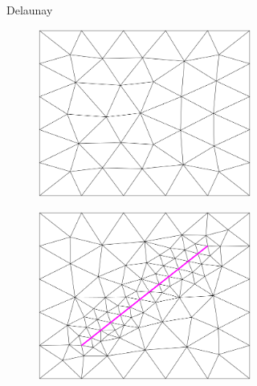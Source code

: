 \begin{figure}[p]
\begin{subfigure}[b]{\textwidth}
\begin{subfigure}[b]{0.33\textwidth}
        \end{subfigure}
        \caption{Delaunay}
        \label{fig:Gmsh-Delaunay}
    \end{subfigure}
    \begin{subfigure}[b]{\textwidth}
        \centering
        \begin{subfigure}[b]{0.33\textwidth}
            \centering
            \includegraphics[width=\textwidth]{report/Images/Software/Gmsh meshing algorithms/gmsh_meshing_algorithms_frontal.png}
        \end{subfigure}
        \begin{subfigure}[b]{0.33\textwidth}
            \centering
            \includegraphics[width=\textwidth]{report/Images/Software/Gmsh meshing algorithms/gmsh_meshing_algorithms_embedded_frontal.png}

\end{subfigure}
\end{subfigure}
\end{figure}
